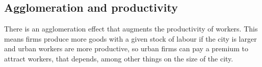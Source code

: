 \subsection{Agglomeration and productivity}\label{sec:Production-fn}

There is an agglomeration effect that augments the productivity of workers. This means firms produce more goods with a given stock of labour if the city is larger and urban workers are more productive, %
so urban firms can pay a premium to attract workers, that depends, among other things on the size of the city. %


